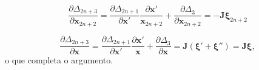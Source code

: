 \documentclass[
	12pt,
	oneside,			%
	a4paper,			%
	english,			%
	brazil				%
	]{abntex2}
\theoremstyle{definition}
\begin{document}
\begin{apendicesenv}
\begin{equation}
    \frac{\partial \Delta_{2n+3}}{\partial \mathbf{x}_{2n+2}} = \frac{\partial \Delta_{2n+1}}{\partial \mathbf{x}'} \frac{\partial \mathbf{x}'}{\mathbf{x}_{2n+2}} + \frac{\partial \Delta_3}{\partial \mathbf{x}_{2n+2}} = -\mathbf{J} \boldsymbol{\xi}_{2n+2}
\end{equation}

\begin{equation}
    \frac{\partial \Delta_{2n+3}}{\partial \mathbf{x}} = \frac{\partial \Delta_{2n+1}}{\partial \mathbf{x}'} \frac{\partial \mathbf{x}'}{\mathbf{x}} + \frac{\partial \Delta_3}{\partial \mathbf{x}} = \mathbf{J}\left(\boldsymbol{\xi}'+\boldsymbol{\xi}''\right) = \mathbf{J}\boldsymbol{\xi},
\end{equation}
o que completa o argumento.


\end{apendicesenv}
\end{document}
